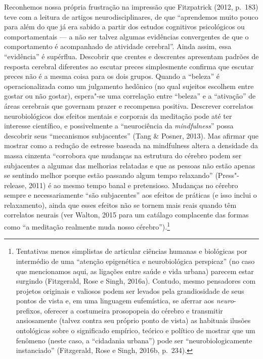 Reconhemos nossa própria frustração na impressão que Fitzpatrick (2012,
p.~183) teve com a leitura de artigos neurodisciplinares, de que
``aprendemos muito pouco para além do que já era sabido
a partir dos estudos cognitivos psicológicos ou comportamentais --- a
não ser talvez algumas evidências convergentes de que o comportamento é
acompanhado de atividade cerebral''. Ainda assim, essa ``evidência'' é
supérflua. Descobrir que crentes e descrentes apresentam padrões de
resposta cerebral diferentes ao escutar preces simplesmente confirma que
escutar preces não é a mesma coisa para os dois grupos. Quando
a ``beleza'' é operacionalizada como um julgamento hedônico (no qual
sujeitos escolhem entre gostar ou não gostar), espera"-se uma correlação
entre ``beleza'' e a ``ativação'' de áreas cerebrais que governam prazer
e recompensa positiva. Descrever correlatos neurobiológicos dos efeitos
mentais e corporais da meditação pode até ter interesse científico, e
possivelmente a ``neurociência da \emph{mindfulness}'' possa descobrir seus
``mecanismos subjacentes'' (Tang \& Posner, 2013). Mas afirmar que
mostrar como a redução de estresse baseada na mindfulness altera a
densidade da massa cinzenta ``corrobora que mudanças na estrutura do
cérebro podem ser subjacentes a algumas das melhorias relatadas e que as
pessoas não estão apenas se sentindo melhor porque estão passando algum
tempo relaxando'' (Press"-release, 2011) é ao mesmo tempo banal e
pretensioso. Mudanças no cérebro sempre e necessariamente ``são
subjacentes'' aos efeitos de práticas (e isso inclui o relaxamento), ainda
que esses efeitos não se tornem mais reais quando têm correlatos neurais
(ver Walton, 2015 para um catálago complacente das formas como ``a
meditação realmente muda nosso cérebro'').\footnote[7]{Tentativas menos simplistas de articular ciências humanas e
biológicas por intermédio de uma ``atenção epigenética e neurobiológica
perspicaz'' (no caso que mencionamos aqui, as ligações entre saúde e vida
urbana) parecem estar surgindo (Fitzgerald, Rose e Singh, 2016a).
Contudo, mesmo pensadores com projetos originais e valiosos
podem ser levados pela grandiosidade de seus pontos de vista e, em uma
linguagem eufemística, se aferrar aos \emph{neuro}-prefixos, oferecer a
costumeira prosopopeia do cérebro e transmitir ansiosamente (talvez
contra seu próprio ponto de vista) as habituais ilusões ontológicas
sobre o significado empírico, teórico e político de mostrar que um
fenômeno (neste caso, a ``cidadania urbana'') pode ser
``neurobiologicamente instanciado'' (Fitzgerald, Rose e Singh, 2016b,
p.~234).}

